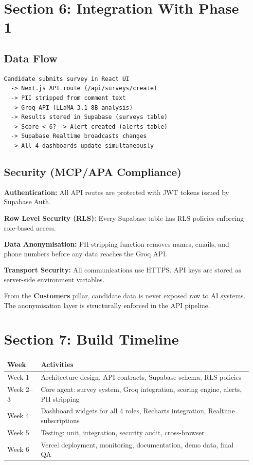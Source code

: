 \documentclass[11pt, a4paper]{article}
\begin{document}
\section{Section 6: Integration With Phase 1}

\subsection{Data Flow}

\begin{lstlisting}
Candidate submits survey in React UI
  -> Next.js API route (/api/surveys/create)
  -> PII stripped from comment text
  -> Groq API (LLaMA 3.1 8B analysis)
  -> Results stored in Supabase (surveys table)
  -> Score < 6? -> Alert created (alerts table)
  -> Supabase Realtime broadcasts changes
  -> All 4 dashboards update simultaneously
\end{lstlisting}

\subsection{Security (MCP/APA Compliance)}

\textbf{Authentication:} All API routes are protected with JWT tokens issued by Supabase Auth.

\textbf{Row Level Security (RLS):} Every Supabase table has RLS policies enforcing role-based access.

\textbf{Data Anonymisation:} PII-stripping function removes names, emails, and phone numbers before any data reaches the Groq API.

\textbf{Transport Security:} All communications use HTTPS. API keys are stored as server-side environment variables.

From the \textbf{Customers} pillar, candidate data is never exposed raw to AI systems. The anonymisation layer is structurally enforced in the API pipeline.

\section{Section 7: Build Timeline}

\begin{tabularx}{\textwidth}{l X}
\toprule
\textbf{Week} & \textbf{Activities} \\
\midrule
Week 1 & Architecture design, API contracts, Supabase schema, RLS policies \\
Week 2--3 & Core agent: survey system, Groq integration, scoring engine, alerts, PII stripping \\
Week 4 & Dashboard widgets for all 4 roles, Recharts integration, Realtime subscriptions \\
Week 5 & Testing: unit, integration, security audit, cross-browser \\
Week 6 & Vercel deployment, monitoring, documentation, demo data, final QA \\
\bottomrule
\end{tabularx}
\end{document}
